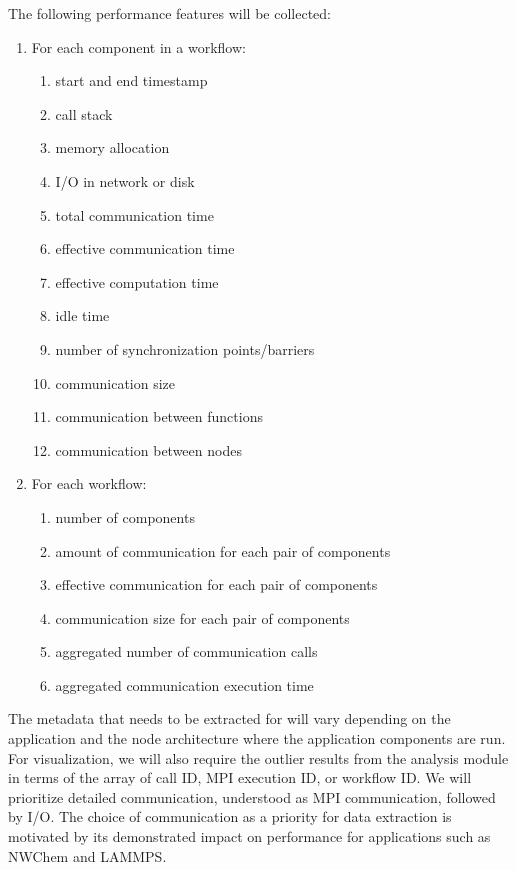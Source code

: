 The following performance features will be collected:
\begin{enumerate}
\item For each component in a workflow:
\begin{enumerate}
\item start and end timestamp
\item call stack
\item memory allocation
\item I/O in network or disk
\item total communication time
\item effective communication time
\item effective computation time
\item idle time
\item number of synchronization points/barriers
\item communication size
\item communication between functions
\item communication between nodes
\end{enumerate}
\item For each workflow:
\begin{enumerate}
\item number of components
\item amount of communication for each pair of components
\item effective communication for each pair of components
\item communication size for each pair of components
\item aggregated number of communication calls 
\item aggregated communication execution time
\end{enumerate}
\end{enumerate}
The metadata that needs to be extracted for will vary depending on the application and the node architecture where the application components are run.
For visualization, we will also require the outlier results from the analysis module in terms of the array of call ID, MPI execution ID, or workflow ID.  
We will prioritize detailed communication, understood as MPI communication, followed by I/O.  The choice of communication as a priority for data extraction is motivated by its demonstrated impact on performance for applications such as NWChem and LAMMPS. 

